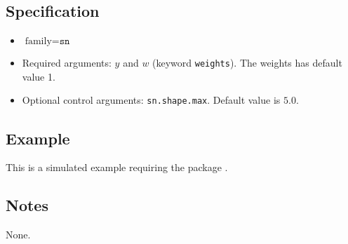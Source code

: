 \documentclass[a4paper,11pt]{article}
\begin{document}
\subsection*{Specification}

\begin{itemize}
\item $\text{family}=\texttt{sn}$
\item Required arguments: $y$ and $w$ (keyword \texttt{weights}). The
    weights has default value 1.
\item Optional control arguments: \texttt{sn.shape.max}. Default value is
    $5.0$.
\end{itemize}


\subsection*{Example}

This is a simulated example requiring the package \verb@sn@.


\subsection*{Notes}

None.
\end{document}
